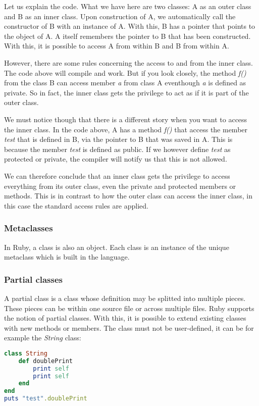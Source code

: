 \documentclass[10pt,a4paper,twocolumn]{article}
\begin{document}
Let us explain the code. What we have here are two classes: A as an outer class and B as an inner class. Upon construction of A, we automatically call the constructor of B with an instance of A. With this, B has a pointer that points to the object of A. A itself remembers the pointer to B that has been constructed. With this, it is possible to access A from within B and B from within A.

However, there are some rules concerning the access to and from the inner class. The code above will compile and work. But if you look closely, the method \textit{f()} from the class B can access member \textit{a} from class A eventhough \textit{a} is defined as private. So in fact, the inner class gets the privilege to act as if it is part of the outer class.

We must notice though that there is a different story when you want to access the inner class. In the code above, A has a method \textit{f()} that access the member \textit{test} that is defined in B, via the pointer to B that was saved in A. This is because the member \textit{test} is defined as public. If we however define \textit{test} as protected or private, the compiler will notify us that this is not allowed.

We can therefore conclude that an inner class gets the privilege to access everything from its outer class, even the private and protected members or methods. This is in contrast to how the outer class can access the inner class, in this case the standard access rules are applied.

\subsubsection{Metaclasses}
In Ruby, a class is also an object. Each class is an instance of the unique metaclass which is built in the language.

\subsubsection{Partial classes}
A partial class is a class whose definition may be splitted into multiple pieces. These pieces can be within one source file or across multiple files. Ruby supports the notion of partial classes. With this, it is possible to extend existing classes with new methods or members. The class must not be user-defined, it can be for example the \textit{String} class: 

\begin{lstlisting}[language=Ruby]
class String
	def doublePrint
		print self
		print self
	end
end
puts "test".doublePrint
\end{lstlisting}
\end{document}
